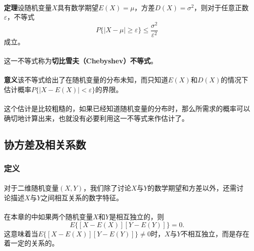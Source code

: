 \paragraph{}
\textbf{定理\;}设随机变量$X$具有数学期望$E(X)=\mu$，方差$D(X)=\sigma^2$，则对于任意正数$\varepsilon$，不等式
\begin{equation}
  P\{|X-\mu| \geq \varepsilon \} \leq \frac{\sigma^2}{\varepsilon^2}
\end{equation}
成立。

\paragraph{}
这一不等式称为\textbf{切比雪夫（Chebyshev）不等式}。

\paragraph{}
\textbf{意义\;}该不等式给出了在随机变量的分布未知，而只知道$E(X)$和$D(X)$的情况下估计概率$P\{|X-E(X)|<\varepsilon\}$的界限。
\paragraph{}
这个估计是比较粗糙的，如果已经知道随机变量的分布时，那么所需求的概率可以确切地计算出来，也就没有必要利用这一不等式来作估计了。

\subsection{协方差及相关系数}
\subsubsection{定义}
\paragraph{}
对于二维随机变量$(X,Y)$，我们除了讨论$X$与$Y$的数学期望和方差以外，还需讨论描述$X$与$Y$之间相互关系的数字特征。

\paragraph{}
在本章的中如果两个随机变量$X$和$Y$是相互独立的，则
\begin{equation}
  E\{[X - E(X)][Y - E(Y)]\} = 0.
\end{equation}
这意味着当$E\{[X - E(X)][Y - E(Y)]\} \neq 0$时，$X$与$Y$不相互独立，而是存在着一定的关系的。


